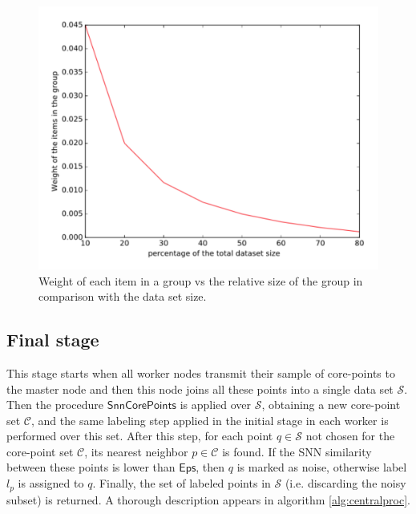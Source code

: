 \documentclass[smallextended]{svjour3}       %
\newcommand*\pct{\scalebox{.9}{\%}}
\begin{document}
\begin{figure}[!htbp]
\centering
  \includegraphics[scale=0.6]{group_weights.pdf}
  \caption{Weight of each item in a group vs the relative size of the group in comparison with the data set size.}
  \label{fig:group_weight}
\end{figure}

\subsection*{Final stage}
This stage starts when all worker nodes transmit their sample of core-points to the master node and then this node joins all these points into a single data set $\mathcal{S}$. 
Then the procedure $\mathsf{SnnCorePoints}$ is applied over $\mathcal{S}$, obtaining a new core-point set $\mathcal{C}$, and the same labeling step applied in the initial stage in each worker is performed over this set. After this step, for each point $q\in\mathcal{S}$ not chosen for the core-point set $\mathcal{C}$, its nearest neighbor  $p\in\mathcal{C}$ is found. If the SNN similarity between these points is lower than $\mathsf{Eps}$, then $q$ is marked as noise, otherwise label $l_p$ is assigned to $q$.
Finally, the set of labeled points in $\mathcal{S}$ (i.e. discarding the noisy subset) is returned.
A thorough description appears in algorithm \ref{alg:centralproc}.
\end{document}
